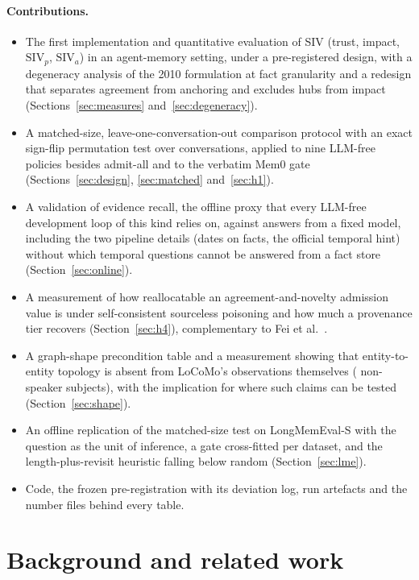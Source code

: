 \documentclass{ceurart}
\newcommand{\SIVp}{\mathrm{SIV}_p}
\newcommand{\SIVa}{\mathrm{SIV}_a}
\begin{document}
\paragraph{Contributions.}
\begin{itemize}
  \item The first implementation and quantitative evaluation of SIV (trust, impact, $\SIVp$, $\SIVa$) in an agent-memory setting, under a pre-registered design, with a degeneracy analysis of the 2010 formulation at fact granularity and a redesign that separates agreement from anchoring and excludes hubs from impact (Sections~\ref{sec:measures} and~\ref{sec:degeneracy}).
  \item A matched-size, leave-one-conversation-out comparison protocol with an exact sign-flip permutation test over conversations, applied to nine LLM-free policies besides admit-all and to the verbatim Mem0 gate (Sections~\ref{sec:design}, \ref{sec:matched} and~\ref{sec:h1}).
  \item A validation of evidence recall, the offline proxy that every LLM-free development loop of this kind relies on, against answers from a fixed model, including the two pipeline details (dates on facts, the official temporal hint) without which temporal questions cannot be answered from a fact store (Section~\ref{sec:online}).
  \item A measurement of how reallocatable an agreement-and-novelty admission value is under self-consistent sourceless poisoning and how much a provenance tier recovers (Section~\ref{sec:h4}), complementary to Fei et al.~\cite{fei2026selection}.
  \item A graph-shape precondition table and a measurement showing that entity-to-entity topology is absent from LoCoMo's observations themselves (\obsNonSpeakerSubjShare{} non-speaker subjects), with the implication for where such claims can be tested (Section~\ref{sec:shape}).
  \item An offline replication of the matched-size test on LongMemEval-S with the question as the unit of inference, a gate cross-fitted per dataset, and the length-plus-revisit heuristic falling below random (Section~\ref{sec:lme}).
  \item Code, the frozen pre-registration with its deviation log, run artefacts and the number files behind every table.
\end{itemize}

\section{Background and related work}
\label{sec:related}
\end{document}
